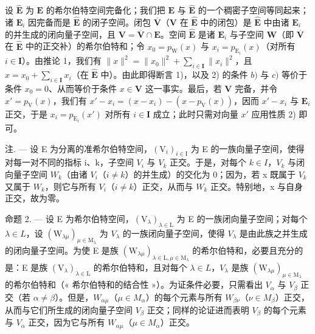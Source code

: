 设 \(\hat{\mathbf{E}}\) 为 \(\mathbf{E}\) 的希尔伯特空间完备化；我们把 \(\mathbf{E}\) 与 \(\hat{\mathbf{E}}\) 的一个稠密子空间等同起来；诸 \(\mathbf{E}_i\) 因完备而是 \(\hat{\mathbf{E}}\) 的闭子空间。闭包 \(\overline{\mathbf{V}}\)（\(\mathbf{V}\) 在 \(\hat{\mathbf{E}}\) 中的闭包）是 \(\hat{\mathbf{E}}\) 中由诸 \(\mathbf{E}_i\) 的并生成的闭向量子空间，且 \(\mathbf{V} = \overline{\mathbf{V}} \cap \mathbf{E}\)。空间 \(\hat{\mathbf{E}}\) 是诸 \(\mathbf{E}_i\) 与子空间 \(\mathbf{W}\)（即 \(\overline{\mathbf{V}}\) 在 \(\hat{\mathbf{E}}\) 中的正交补）的希尔伯特和；令 \(x_0 = p_{\mathrm{W}}(x)\) 与 \(x_i = p_{\mathrm{E}_i}(x)\)（对所有 \(i \in \mathbf{I}\)）。由推论 1，我们有 \(\| x\|^2 = \| x_0\|^2 + \sum_{i \in \mathbf{I}} \| x_i\|^2\)，且 \(x = x_0 + \sum_{i \in \mathbf{I}} x_i\)（在 \(\hat{\mathbf{E}}\) 中）。由此即得断言 1)，以及 2) 的条件 \(b)\) 与 \(c)\) 等价于条件 \(x_0 = 0\)、从而等价于条件 \(x \in \mathbf{V}\) 这一事实。最后，若 \(\mathbf{V}\) 完备，并令 \(x' = p_{\mathrm{V}}(x)\)，我们有 \(x' - x_i = (x - x_i) - (x - p_{\mathrm{V}}(x))\)，因而 \(x' - x_i\) 与 \(\mathbf{E}_i\) 正交，于是 \(x_i = p_{\mathrm{E}_i}(x')\) 对所有 \(i \in \mathbf{I}\) 成立；此时只需对向量 \(x'\) 应用性质 2) 即可。

注. --- 设 E 为分离的准希尔伯特空间，\((\mathrm{V}_{i})_{i\in\mathrm{I}}\) 为 E 的一族向量子空间，使得对每一对不同的指标 i、k，子空间 \(V_{i}\) 与 \(V_{k}\) 正交。于是，对每个 \(k\in I\)，\(V_{k}\) 与闭向量子空间 \(W_{k}\)（由诸 \(V_{i}\)（\(i\neq k\)）的并生成）的交化为 0；因为，若 x 既属于 \(V_{k}\) 又属于 \(W_{k}\)，则它与所有 \(V_{i}\)（\(i\neq k\)）正交，从而与 \(W_{k}\) 正交。特别地，x 与自身正交，故为零。

命题 2. --- 设 E 为希尔伯特空间，\((\mathrm{V}_{\lambda})_{\lambda\in\mathrm{L}}\) 为 E 的一族闭向量子空间；对每个 \(\lambda\in L\)，设 \((\mathrm{W}_{\lambda\mu})_{\mu\in\mathrm{M}_{\lambda}}\) 为 \(V_{\lambda}\) 的一族闭向量子空间，使得 \(V_{\lambda}\) 是由此族之并生成的闭向量子空间。为使 E 是族 \((\mathrm{W}_{\lambda\mu})_{\lambda\in\mathrm{L},\mu\in\mathrm{M}_{\lambda}}\) 的希尔伯特和，必要且充分的是：E 是族 \((\mathrm{V}_{\lambda})_{\lambda\in\mathrm{L}}\) 的希尔伯特和，且对每个 \(\lambda\in L\)，\(V_{\lambda}\) 是族 \((\mathrm{W}_{\lambda\mu})_{\mu\in\mathrm{M}_{\lambda}}\) 的希尔伯特和（« 希尔伯特和的结合性 »）。为证条件必要，只需看出 \(V_{\alpha}\) 与 \(V_{\beta}\) 正交（若 \(\alpha\neq\beta\)）。但是，\(W_{\alpha\mu}\)（\(\mu\in M_{\alpha}\)）的每个元素与所有 \(W_{\beta\nu}\)（\(\nu\in M_{\beta}\)）正交，从而与它们所生成的闭向量子空间 \(V_{\beta}\) 正交；同样的论证进而表明 \(V_{\beta}\) 的每个元素与 \(V_{\alpha}\) 正交，因为它与所有 \(W_{\alpha\mu}\)（\(\mu\in M_{\alpha}\)）正交。

